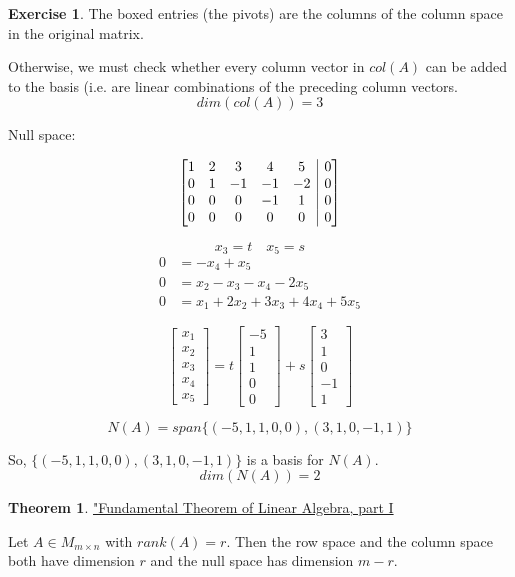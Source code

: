 \documentclass{report}
\makeatletter
\newenvironment{amatrix}[1]{%
  \left[\begin{array}{@{}*{#1}{c}|c@{}}
}{%
  \end{array}\right]
}
\theoremstyle{definition}
\newtheorem{_exc}{Exercise}[section]
\newtheorem{_thm}{Theorem}[section]
\theoremstyle{remark}
\makeatother
\begin{document}
\begin{_exc}
The boxed entries (the pivots) are the columns of the column space in the original matrix.

Otherwise, we must check whether every column vector in $col(A)$ can be added to the basis (i.e. are linear combinations of the preceding column vectors.
\[dim(col(A))=3\]

Null space:

\[\begin{amatrix}{5}
1 & 2 & 3 & 4 & 5 & 0 \\
0 & 1 &-1 &-1 &-2 & 0 \\
0 & 0 & 0 &-1 & 1 & 0 \\
0 & 0 & 0 & 0 & 0 & 0
\end{amatrix}\]

\[x_3=t\quad x_5=s\]
\begin{align*}
0&=-x_4+x_5\\
0&=x_2-x_3-x_4-2x_5\\
0&=x_1+2x_2+3x_3+4x_4+5x_5
\end{align*}

\[\begin{bmatrix}
x_1 \\ x_2 \\ x_3 \\ x_4 \\ x_5
\end{bmatrix}=t
\begin{bmatrix}
-5 \\ 1 \\ 1 \\ 0 \\ 0
\end{bmatrix}+s
\begin{bmatrix}
3 \\ 1 \\ 0 \\ -1 \\ 1
\end{bmatrix}\]

\[N(A)=span\{(-5,1,1,0,0),(3,1,0,-1,1)\}\]

So, $\{(-5,1,1,0,0),(3,1,0,-1,1)\}$ is a basis for $N(A)$.
\[dim(N(A))=2\]
\end{_exc}

\begin{_thm}
\underline{"Fundamental Theorem of Linear Algebra, part I}

Let $A\in M_{m\times n}$ with $rank(A)=r$.
Then the row space and the column space both have dimension $r$ and the null space has dimension $m-r$.
\end{_thm}
\end{document}

